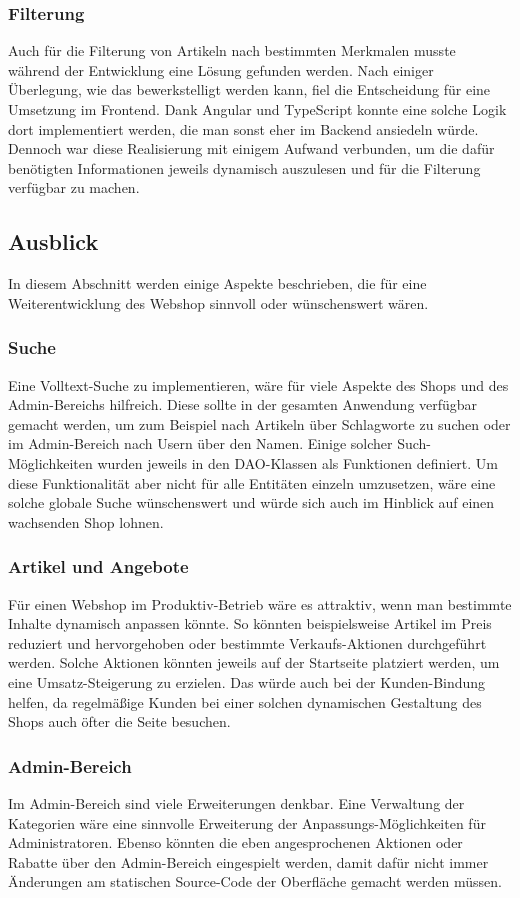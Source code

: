 \subsubsection{Filterung}
Auch für die Filterung von Artikeln nach bestimmten Merkmalen musste während der Entwicklung eine Lösung gefunden werden.
Nach einiger Überlegung, wie das bewerkstelligt werden kann, fiel die Entscheidung für eine Umsetzung im Frontend.
Dank Angular und TypeScript konnte eine solche Logik dort implementiert werden, die man sonst eher im Backend ansiedeln würde.
Dennoch war diese Realisierung mit einigem Aufwand verbunden, um die dafür benötigten Informationen jeweils dynamisch auszulesen und für die Filterung verfügbar zu machen.
\subsection{Ausblick}
In diesem Abschnitt werden einige Aspekte beschrieben, die für eine Weiterentwicklung des Webshop sinnvoll oder wünschenswert wären.
\subsubsection{Suche}
Eine Volltext-Suche zu implementieren, wäre für viele Aspekte des Shops und des Admin-Bereichs hilfreich.
Diese sollte in der gesamten Anwendung verfügbar gemacht werden, um zum Beispiel nach Artikeln über Schlagworte zu suchen oder im Admin-Bereich nach Usern über den Namen.
Einige solcher Such-Möglichkeiten wurden jeweils in den \acs{DAO}-Klassen als Funktionen definiert.
Um diese Funktionalität aber nicht für alle Entitäten einzeln umzusetzen, wäre eine solche globale Suche wünschenswert und würde sich auch im Hinblick auf einen wachsenden Shop lohnen.
\subsubsection{Artikel und Angebote}
Für einen Webshop im Produktiv-Betrieb wäre es attraktiv, wenn man bestimmte Inhalte dynamisch anpassen könnte.
So könnten beispielsweise Artikel im Preis reduziert und hervorgehoben oder bestimmte Verkaufs-Aktionen durchgeführt werden.
Solche Aktionen könnten jeweils auf der Startseite platziert werden, um eine Umsatz-Steigerung zu erzielen.
Das würde auch bei der Kunden-Bindung helfen, da regelmäßige Kunden bei einer solchen dynamischen Gestaltung des Shops auch öfter die Seite besuchen.
\subsubsection{Admin-Bereich}
Im Admin-Bereich sind viele Erweiterungen denkbar. Eine Verwaltung der Kategorien wäre eine sinnvolle Erweiterung der Anpassungs-Möglichkeiten für Administratoren.
Ebenso könnten die eben angesprochenen Aktionen oder Rabatte über den Admin-Bereich eingespielt werden, damit dafür nicht immer Änderungen am statischen Source-Code der Oberfläche gemacht werden müssen.
